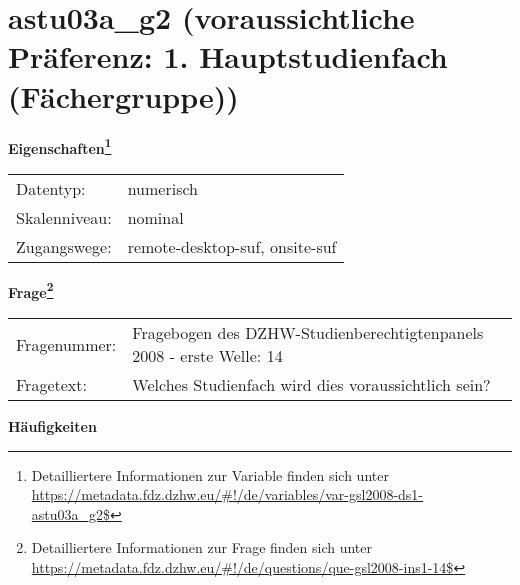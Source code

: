 
    \setcounter{footnote}{0}

    \vspace*{-1.8cm}
	\section{astu03a\_g2 (voraussichtliche Präferenz: 1. Hauptstudienfach (Fächergruppe))}
	\label{section:astu03a_g2}



    \vspace*{0.5cm}
    \noindent\textbf{Eigenschaften\footnote{Detailliertere Informationen zur Variable finden sich unter
		\url{https://metadata.fdz.dzhw.eu/\#!/de/variables/var-gsl2008-ds1-astu03a_g2$}}}\\
	\begin{tabularx}{\hsize}{@{}lX}
	Datentyp: & numerisch \\
	Skalenniveau: & nominal \\
	Zugangswege: &
	  remote-desktop-suf, 
	  onsite-suf
 \\
    \end{tabularx}



				\vspace*{0.5cm}
                \noindent\textbf{Frage\footnote{Detailliertere Informationen zur Frage finden sich unter
		              \url{https://metadata.fdz.dzhw.eu/\#!/de/questions/que-gsl2008-ins1-14$}}}\\
				\begin{tabularx}{\hsize}{@{}lX}
					Fragenummer: &
					  Fragebogen des DZHW-Studienberechtigtenpanels 2008 - erste Welle:
					  14
 \\
					Fragetext: & Welches Studienfach wird dies voraussichtlich sein? \\
				\end{tabularx}





        		\vspace*{0.5cm}
                \noindent\textbf{Häufigkeiten}

